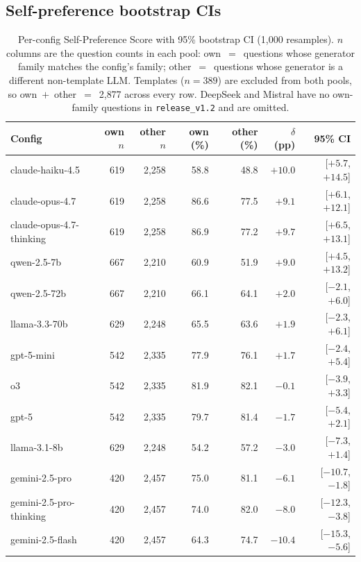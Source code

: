 \FloatBarrier
\subsection{Self-preference bootstrap CIs}

\begin{table}[H]
  \centering
  \footnotesize
  \caption{Per-config Self-Preference Score with 95\% bootstrap CI
    (1{,}000 resamples). $n$ columns are the question counts in each
    pool: own~$=$~questions whose generator family matches the
    config's family; other~$=$~questions whose generator is a
    different non-template LLM. Templates ($n{=}389$) are excluded
    from both pools, so own~$+$~other~$=$~2{,}877 across every row.
    DeepSeek and Mistral have no own-family questions in
    \texttt{release\_v1.2} and are omitted.}
  \label{tab:sps-full}
  \begin{tabular}{lrrrrrr}
    \toprule
    Config & own $n$ & other $n$ & own (\%) & other (\%) & $\delta$ (pp) & 95\% CI \\
    \midrule
    claude-haiku-4.5             & 619 & 2{,}258 & 58.8 & 48.8 & $+10.0$ & [$+5.7$, $+14.5$] \\
    claude-opus-4.7              & 619 & 2{,}258 & 86.6 & 77.5 & $+9.1$  & [$+6.1$, $+12.1$] \\
    claude-opus-4.7-thinking     & 619 & 2{,}258 & 86.9 & 77.2 & $+9.7$  & [$+6.5$, $+13.1$] \\
    qwen-2.5-7b                  & 667 & 2{,}210 & 60.9 & 51.9 & $+9.0$  & [$+4.5$, $+13.2$] \\
    qwen-2.5-72b                 & 667 & 2{,}210 & 66.1 & 64.1 & $+2.0$  & [$-2.1$, $+6.0$] \\
    llama-3.3-70b                & 629 & 2{,}248 & 65.5 & 63.6 & $+1.9$  & [$-2.3$, $+6.1$] \\
    gpt-5-mini                   & 542 & 2{,}335 & 77.9 & 76.1 & $+1.7$  & [$-2.4$, $+5.4$] \\
    o3                           & 542 & 2{,}335 & 81.9 & 82.1 & $-0.1$  & [$-3.9$, $+3.3$] \\
    gpt-5                        & 542 & 2{,}335 & 79.7 & 81.4 & $-1.7$  & [$-5.4$, $+2.1$] \\
    llama-3.1-8b                 & 629 & 2{,}248 & 54.2 & 57.2 & $-3.0$  & [$-7.3$, $+1.4$] \\
    gemini-2.5-pro               & 420 & 2{,}457 & 75.0 & 81.1 & $-6.1$  & [$-10.7$, $-1.8$] \\
    gemini-2.5-pro-thinking      & 420 & 2{,}457 & 74.0 & 82.0 & $-8.0$  & [$-12.3$, $-3.8$] \\
    gemini-2.5-flash             & 420 & 2{,}457 & 64.3 & 74.7 & $-10.4$ & [$-15.3$, $-5.6$] \\
    \bottomrule
  \end{tabular}
\end{table}

